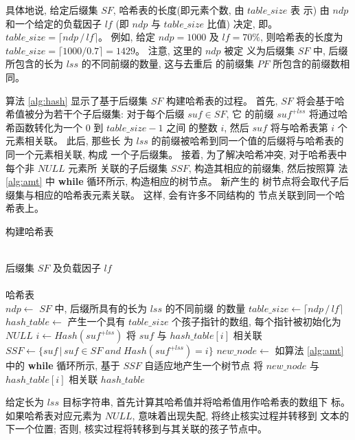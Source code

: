 具体地说, 给定后缀集 $SF$, 哈希表的长度(即元素个数, 由 $table\_size$ 表
示) 由 $ndp$ 和一个给定的负载因子 $lf$
(即 $ndp$ 与 $table\_size$ 比值) 决定, 即。
$table\_size = \lceil ndp\,/\,lf \rceil$。 例如, 给定 $ndp =
1000$ 及 $lf = 70\%$, 则哈希表的长度为
$table\_size = \lceil 1000/0.7 \rceil = 1429$。 注意, 这里的 $ndp$ 被定
义为后缀集 $SF$ 中, 后缀所包含的长为 $lss$ 的不同前缀的数量, 这与去重后
的前缀集 $PF$ 所包含的前缀数相同。

算法 \ref{alg:hash} 显示了基于后缀集 $SF$ 构建哈希表的过程。  首先,
$SF$ 将会基于哈希值被分为若干个子后缀集: 对于每个后缀 $suf \in SF$, 它
的前缀 $suf^{+lss}$ 将通过哈希函数转化为一个 0 到 $table\_size-1$ 之间
的整数 $i$, 然后 $suf$ 将与哈希表第 $i$ 个元素相关联。 此后, 那些长
为 $lss$ 的前缀被哈希到同一个值的后缀将与哈希表的同一个元素相关联, 构成
一个子后缀集。 接着, 为了解决哈希冲突, 对于哈希表中每个非 $NULL$ 元素所
关联的子后缀集 $SSF$, 构造其相应的前缀集, 然后按照算
法 \ref{alg:amt} 中 \textbf{while} 循环所示, 构造相应的树节点。 新产生的
树节点将会取代子后缀集与相应的哈希表元素关联。 这样, 会有许多不同结构的
节点关联到同一个哈希表上。

\begin{algorithm}
  \caption{构建哈希表}
  \label{alg:hash}
  \begin{algorithmic}[1]
    \REQUIRE ~~\\
    后缀集 $SF$ 及负载因子 $lf$ \\
    \ENSURE ~~\\
    哈希表\\
    \STATE
    \STATE $ndp \leftarrow$ $SF$ 中, 后缀所具有的长为 $lss$ 的不同前缀
    的数量
    \STATE $table\_size \leftarrow \lceil ndp\,/\,lf \rceil$
    \STATE $hash\_table \leftarrow$ 产生一个具有
    $table\_size$ 个孩子指针的数组, 每个指针被初始化为 $NULL$
    \STATE
    \STATE $i \leftarrow Hash(suf^{+lss})$
    \STATE 将 $suf$ 与 $hash\_table[i]$ 相关联
    \ENDFOR
    \STATE
    \STATE $SSF \leftarrow \{suf\,|\,suf\in SF\; and\; Hash(suf^{+lss})=i\}$
    \STATE $new\_node \leftarrow$ 如算法 \ref{alg:amt} 中的
    \textbf{while} 循环所示, 基于 $SSF$ 自适应地产生一个树节点
    \STATE 将 $new\_node$ 与 $hash\_table[i]$ 相关联
    \ENDIF
    \ENDFOR
    \STATE
    \RETURN $hash\_table$
  \end{algorithmic}
\end{algorithm}

给定长为 $lss$ 目标字符串, 首先计算其哈希值并将哈希值用作哈希表的数组下
标。 如果哈希表对应元素为 $NULL$, 意味着出现失配, 将终止核实过程并转移到
文本的下一个位置; 否则, 核实过程将转移到与其关联的孩子节点中。

